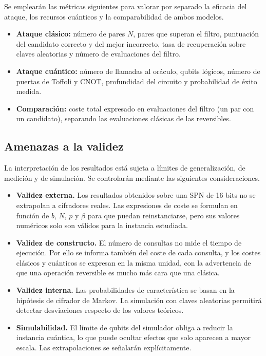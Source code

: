 Se emplearán las métricas siguientes para valorar por separado la eficacia del ataque, los recursos cuánticos y la comparabilidad de ambos modelos.

\begin{itemize}
 \item \textbf{Ataque clásico:} número de pares \(N\), pares que superan el filtro, puntuación del candidato correcto y del mejor incorrecto, tasa de recuperación sobre claves aleatorias y número de evaluaciones del filtro.
 \item \textbf{Ataque cuántico:} número de llamadas al oráculo, qubits lógicos, número de puertas de Toffoli y CNOT, profundidad del circuito y probabilidad de éxito medida.
 \item \textbf{Comparación:} coste total expresado en evaluaciones del filtro (un par con un candidato), separando las evaluaciones clásicas de las reversibles.
\end{itemize}

\subsection{Amenazas a la validez}

La interpretación de los resultados está sujeta a límites de generalización, de medición y de simulación. Se controlarán mediante las siguientes consideraciones.

\begin{itemize}
 \item \textbf{Validez externa.} Los resultados obtenidos sobre una SPN de 16 bits no se extrapolan a cifradores reales. Las expresiones de coste se formulan en función de \(b\), \(N\), \(p\) y \(\beta\) para que puedan reinstanciarse, pero sus valores numéricos solo son válidos para la instancia estudiada.
 \item \textbf{Validez de constructo.} El número de consultas no mide el tiempo de ejecución. Por ello se informa también del coste de cada consulta, y los costes clásicos y cuánticos se expresan en la misma unidad, con la advertencia de que una operación reversible es mucho más cara que una clásica.
 \item \textbf{Validez interna.} Las probabilidades de característica se basan en la hipótesis de cifrador de Markov. La simulación con claves aleatorias permitirá detectar desviaciones respecto de los valores teóricos.
 \item \textbf{Simulabilidad.} El límite de qubits del simulador obliga a reducir la instancia cuántica, lo que puede ocultar efectos que solo aparecen a mayor escala. Las extrapolaciones se señalarán explícitamente.
\end{itemize}
